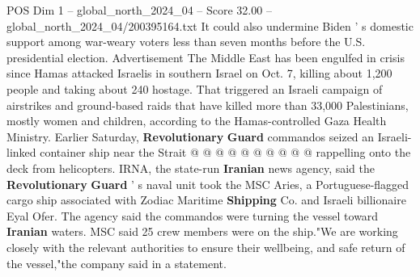 \begin{textsample}{POS Dim 1 – global\_north\_2024\_04 – Score 32.00 – global\_north\_2024\_04/200395164.txt}
It could also undermine Biden ' s domestic support among war-weary voters less than seven months before the U.S. presidential election.
Advertisement The Middle East has been engulfed in crisis since Hamas attacked Israelis in southern Israel on Oct. 7, killing about 1,200 people and taking about 240 hostage.
That triggered an Israeli campaign of airstrikes and ground-based raids that have killed more than 33,000 Palestinians, mostly women and children, according to the Hamas-controlled Gaza Health Ministry.
Earlier Saturday, \textbf{Revolutionary} \textbf{Guard} commandos seized an Israeli-linked container ship near the Strait @ @ @ @ @ @ @ @ @ @ rappelling onto the deck from helicopters.
IRNA, the state-run \textbf{Iranian} news agency, said the \textbf{Revolutionary} \textbf{Guard} ' s naval unit took the MSC Aries, a Portuguese-flagged cargo ship associated with Zodiac Maritime \textbf{Shipping} Co. and Israeli billionaire Eyal Ofer.
The agency said the commandos were turning the vessel toward \textbf{Iranian} waters.
MSC said 25 crew members were on the ship."We are working closely with the relevant authorities to ensure their wellbeing, and safe return of the vessel,"the company said in a statement.

\end{textsample}
